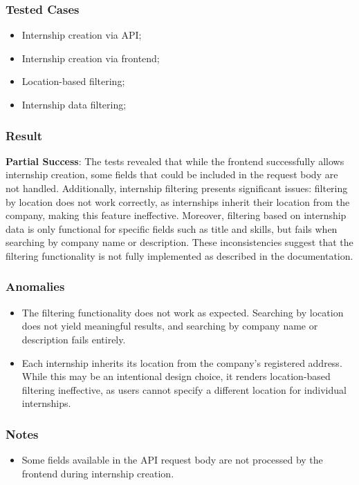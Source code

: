 \subsubsection*{Tested Cases}
\begin{itemize}
    \item Internship creation via API;
    \item Internship creation via frontend;
    \item Location-based filtering;
    \item Internship data filtering;
    
\end{itemize}

\subsubsection*{Result}
\textbf{Partial Success}:
The tests revealed that while the frontend successfully allows internship creation, some fields that could be included in the request body are not handled. Additionally, internship filtering presents significant issues: filtering by location does not work correctly, as internships inherit their location from the company, making this feature ineffective. Moreover, filtering based on internship data is only functional for specific fields such as title and skills, but fails when searching by company name or description. These inconsistencies suggest that the filtering functionality is not fully implemented as described in the documentation.
\subsubsection*{Anomalies}
\begin{itemize}
    \item The filtering functionality does not work as expected. Searching by location does not yield meaningful results, and searching by company name or description fails entirely.
    \item Each internship inherits its location from the company’s registered address. While this may be an intentional design choice, it renders location-based filtering ineffective, as users cannot specify a different location for individual internships.
\end{itemize}
\subsubsection*{Notes}
\begin{itemize}
    \item Some fields available in the API request body are not processed by the frontend during internship creation. 
\end{itemize}

